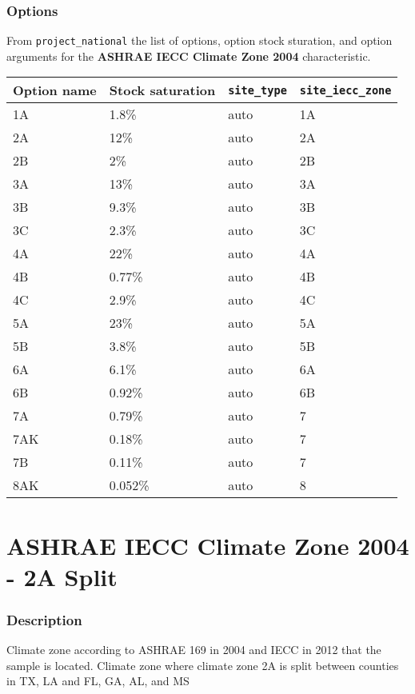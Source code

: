 \subsubsection{Options}\label{options-2}

From \texttt{project\_national} the list of options, option stock
sturation, and option arguments for the \textbf{ASHRAE IECC Climate Zone
2004} characteristic.

\begin{longtable}[]{@{}llll@{}}
\toprule\noalign{}
Option name & Stock saturation & \texttt{site\_type} &
\texttt{site\_iecc\_zone} \\
\midrule\noalign{}
\endhead
\bottomrule\noalign{}
\endlastfoot
1A & 1.8\% & auto & 1A \\
2A & 12\% & auto & 2A \\
2B & 2\% & auto & 2B \\
3A & 13\% & auto & 3A \\
3B & 9.3\% & auto & 3B \\
3C & 2.3\% & auto & 3C \\
4A & 22\% & auto & 4A \\
4B & 0.77\% & auto & 4B \\
4C & 2.9\% & auto & 4C \\
5A & 23\% & auto & 5A \\
5B & 3.8\% & auto & 5B \\
6A & 6.1\% & auto & 6A \\
6B & 0.92\% & auto & 6B \\
7A & 0.79\% & auto & 7 \\
7AK & 0.18\% & auto & 7 \\
7B & 0.11\% & auto & 7 \\
8AK & 0.052\% & auto & 8 \\
\end{longtable}

\section{ASHRAE IECC Climate Zone 2004 - 2A
Split}\label{ashrae_iecc_climate_zone_2004___2_a_split}

\subsubsection{Description}\label{description-3}

Climate zone according to ASHRAE 169 in 2004 and IECC in 2012 that the
sample is located. Climate zone where climate zone 2A is split between
counties in TX, LA and FL, GA, AL, and MS

